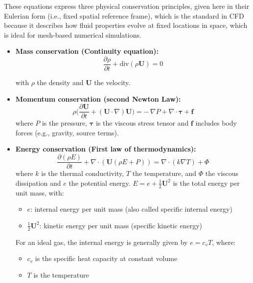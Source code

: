 These equations express three physical conservation principles, given here in their Eulerian form (i.e., fixed spatial reference frame), which is the standard in CFD because it describes how fluid properties evolve at fixed locations in space, which is ideal for mesh-based numerical simulations.


\begin{itemize}
    \item \textbf{Mass conservation (Continuity equation):}
    \begin{equation}
        \frac{\partial \rho}{\partial t} + \text{div}(\rho \mathbf{U}) = 0   %
        \label{eq:mass_conservation}
    \end{equation}

    with $\rho$ the density and $\mathbf{U}$ the velocity.

    \item \textbf{Momentum conservation (second Newton Law):}     %
    \begin{equation}
        \rho\Big(\frac{\partial \mathbf{U}}{\partial t}+(\mathbf{U}\cdot\nabla)\mathbf{U}\Big) = -\,\nabla P + \nabla\!\cdot\boldsymbol{\tau} + \mathbf{f}
    \end{equation}
    where $P$ is the pressure, \( \boldsymbol{\tau} \) is the viscous stress tensor and \( \mathbf{f} \) includes body forces (e.g., gravity, source terms).

    \item \textbf{Energy conservation (First law of thermodynamics):}
    \begin{equation}
        \frac{\partial (\rho E)}{\partial t} + \nabla \cdot (\mathbf{U} (\rho E + P)) = \nabla \cdot (k \nabla T) + \Phi
    \end{equation}
    where \( k \) is the thermal conductivity, \( T \) the temperature, and \( \Phi \) the viscous dissipation and $e$ the potential energy.
    $E = e + \frac{1}{2} \boldsymbol{U}^2$ is the total energy per unit mass, with:

    \begin{itemize}
        \item $e$: internal energy per unit mass (also called specific internal energy)
        \item $\frac{1}{2} \boldsymbol{U}^2$: kinetic energy per unit mass (specific kinetic energy)
    \end{itemize}

    For an ideal gas, the internal energy is generally given by $e = c_v T$, where:
    \begin{itemize}
        \item $c_v$ is the specific heat capacity at constant volume
        \item $T$ is the temperature
    \end{itemize}
\end{itemize}

